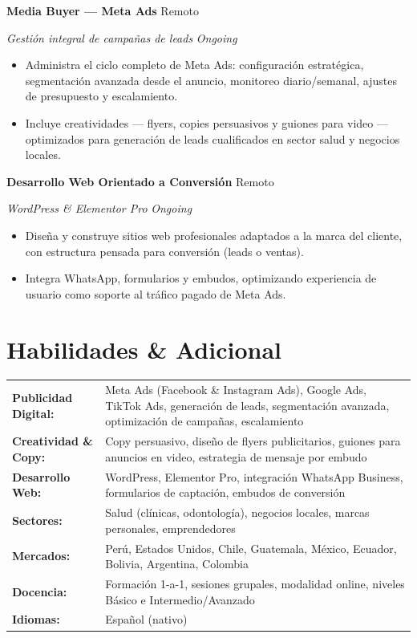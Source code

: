 \documentclass[11pt,letterpaper]{article}
\newcommand{\entry}[4]{%
  \noindent\textbf{#1} \hfill #2 \par\nopagebreak
  \textit{#3} \hfill \textit{#4} \par\nopagebreak
}
\begin{document}
\entry{Media Buyer --- Meta Ads}{Remoto}{Gestión integral de campañas de leads}{Ongoing}
\begin{itemize}
  \item Administra el ciclo completo de Meta Ads: configuración estratégica, segmentación avanzada desde el anuncio, monitoreo diario/semanal, ajustes de presupuesto y escalamiento.
  \item Incluye creatividades --- flyers, copies persuasivos y guiones para video --- optimizados para generación de leads cualificados en sector salud y negocios locales.
\end{itemize}
\vspace{0.3em}

\entry{Desarrollo Web Orientado a Conversión}{Remoto}{WordPress \& Elementor Pro}{Ongoing}
\begin{itemize}
  \item Diseña y construye sitios web profesionales adaptados a la marca del cliente, con estructura pensada para conversión (leads o ventas).
  \item Integra WhatsApp, formularios y embudos, optimizando experiencia de usuario como soporte al tráfico pagado de Meta Ads.
\end{itemize}
\vspace{0.3em}

\section{Habilidades \& Adicional}

\begin{tabularx}{\textwidth}{@{}l X@{}}
\textbf{Publicidad Digital:} & Meta Ads (Facebook \& Instagram Ads), Google Ads, TikTok Ads, generación de leads, segmentación avanzada, optimización de campañas, escalamiento \\
\textbf{Creatividad \& Copy:} & Copy persuasivo, diseño de flyers publicitarios, guiones para anuncios en video, estrategia de mensaje por embudo \\
\textbf{Desarrollo Web:} & WordPress, Elementor Pro, integración WhatsApp Business, formularios de captación, embudos de conversión \\
\textbf{Sectores:} & Salud (clínicas, odontología), negocios locales, marcas personales, emprendedores \\
\textbf{Mercados:} & Perú, Estados Unidos, Chile, Guatemala, México, Ecuador, Bolivia, Argentina, Colombia \\
\textbf{Docencia:} & Formación 1-a-1, sesiones grupales, modalidad online, niveles Básico e Intermedio/Avanzado \\
\textbf{Idiomas:} & Español (nativo) \\
\end{tabularx}
\end{document}
